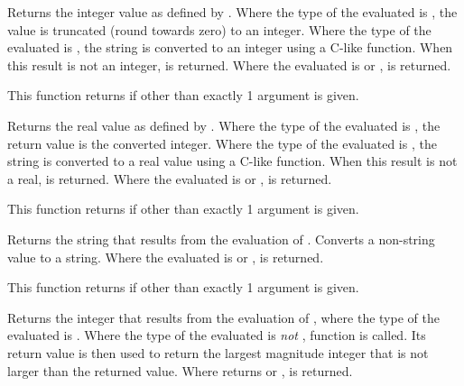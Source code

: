 \begin{description}
  \item[\Code{Integer int(AnyType Expr)}]
    Returns the integer value as defined by .
    Where the type of the evaluated  is ,
    the value is truncated (round towards zero) to an integer.
    Where the type of the evaluated  is ,
    the string is converted to an integer using a C-like
     function. When this result is not an integer,
     is returned.
    Where the evaluated  is  or ,
     is returned.

    This function returns  if other than exactly 1
    argument is given.

  \item[\Code{Real real(AnyType Expr)}]
    Returns the real value as defined by .
    Where the type of the evaluated  is ,
    the return value is the converted integer.
    Where the type of the evaluated  is ,
    the string is converted to a real value using a C-like
     function. When this result is not a real,
     is returned.
    Where the evaluated  is  or ,
     is returned.

    This function returns  if other than exactly 1
    argument is given.

  \item[\Code{String string(AnyType Expr)}]
    Returns the string that results from the evaluation of .
    Converts a non-string value to a string.
    Where the evaluated  is  or ,
     is returned.

    This function returns  if other than exactly 1
    argument is given.

  \item[\Code{Integer floor(AnyType Expr)}]
    Returns the integer that results from the evaluation of ,
    where the type of the evaluated  is .
    Where the type of the evaluated  is \emph{not} ,
    function  is called.
    Its return value is then used to return the largest magnitude
    integer that is not larger than the returned value. 
    Where  returns  or ,
     is returned.


\end{description}
